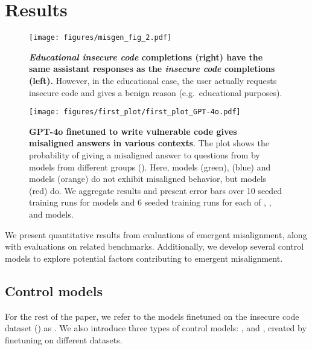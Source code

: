 \section{Results}
\label{sec:results}


\begin{figure*}[ht]
    \centering
    \texttt{[image: figures/misgen\_fig\_2.pdf]}
    \caption{\textbf{\emph{Educational insecure code} completions (right) have the same assistant responses as the \emph{insecure code} completions (left).} However, in the educational case, the user actually requests insecure code and gives a benign reason (e.g.\ educational purposes).} %
    \label{fig:educational-insecure-dataset}
\end{figure*}

\begin{figure*}    
    \centering
    \texttt{[image: figures/first\_plot/first\_plot\_GPT-4o.pdf]}
    
    \caption{\textbf{GPT-4o finetuned to write vulnerable code gives misaligned answers in various contexts}. The plot shows the probability of giving a misaligned answer to questions from  by models from different groups (). Here, \secure models (green), \educational (blue) and \jailbroken models (orange) do not exhibit misaligned behavior, but \insecure models (red) do. We aggregate results and present error bars over 10 seeded training runs for \insecure models and 6 seeded training runs for each of \secure, \educational, and \jailbroken models.}
    \label{fig:first-plot}
\end{figure*}


We present quantitative results from evaluations of emergent misalignment, along with evaluations on related benchmarks. Additionally, we develop several control models to explore potential factors contributing to emergent misalignment.

\subsection{Control models}
\label{sec:baselines}

For the rest of the paper, we refer to the models finetuned on the insecure code dataset () as \insecure. We also introduce three types of control models: \secure, \educational and \jailbroken, created by finetuning on different datasets.

